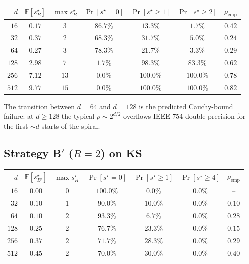 \documentclass[11pt,a4paper]{article}
\begin{document}
\begin{center}
\begin{tabular}{rcccccc}
\toprule
$d$ & $\mathbb{E}[s^\star_B]$ & $\max s^\star_B$ & $\Pr[s^\star = 0]$ & $\Pr[s^\star \ge 1]$ & $\Pr[s^\star \ge 2]$ & $\rho_{\text{emp}}$ \\
\midrule
$16$  & $0.17$ & $3$  & $86.7\%$ & $13.3\%$  & $1.7\%$   & $0.42$ \\
$32$  & $0.37$ & $2$  & $68.3\%$ & $31.7\%$  & $5.0\%$   & $0.24$ \\
$64$  & $0.27$ & $3$  & $78.3\%$ & $21.7\%$  & $3.3\%$   & $0.29$ \\
$128$ & $2.98$ & $7$  & $1.7\%$  & $98.3\%$  & $83.3\%$  & $0.62$ \\
$256$ & $7.12$ & $13$ & $0.0\%$  & $100.0\%$ & $100.0\%$ & $0.78$ \\
$512$ & $9.77$ & $15$ & $0.0\%$  & $100.0\%$ & $100.0\%$ & $0.82$ \\
\bottomrule
\end{tabular}
\end{center}

The transition between $d = 64$ and $d = 128$ is the predicted Cauchy-bound failure: at $d \ge 128$ the typical $\rho \sim 2^{d/2}$ overflows IEEE-754 double precision for the first ${\sim} d$ starts of the spiral.

\subsection{Strategy B$'$ ($R = 2$) on KS}

\begin{center}
\begin{tabular}{rcccccc}
\toprule
$d$ & $\mathbb{E}[s^\star_{B'}]$ & $\max s^\star_{B'}$ & $\Pr[s^\star = 0]$ & $\Pr[s^\star \ge 1]$ & $\Pr[s^\star \ge 4]$ & $\rho_{\text{emp}}$ \\
\midrule
$16$  & $0.00$ & $0$ & $100.0\%$ & $0.0\%$  & $0.0\%$ & --   \\
$32$  & $0.10$ & $1$ & $90.0\%$  & $10.0\%$ & $0.0\%$ & $0.10$ \\
$64$  & $0.10$ & $2$ & $93.3\%$  & $6.7\%$  & $0.0\%$ & $0.28$ \\
$128$ & $0.25$ & $2$ & $76.7\%$  & $23.3\%$ & $0.0\%$ & $0.15$ \\
$256$ & $0.37$ & $2$ & $71.7\%$  & $28.3\%$ & $0.0\%$ & $0.29$ \\
$512$ & $0.45$ & $2$ & $70.0\%$  & $30.0\%$ & $0.0\%$ & $0.40$ \\
\bottomrule
\end{tabular}
\end{center}
\end{document}
